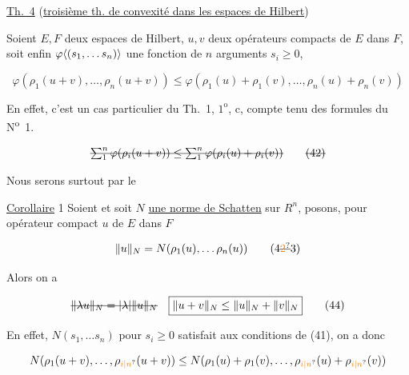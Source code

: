 
\uline{Th.~4} (\uline{troisième th. de convexité dans les espaces de Hilbert})

Soient $E,F$ deux espaces de Hilbert, $u,v$ deux opérateurs compacts de $E$ dans $F$, soit enfin $\varphi\inserted{(s_1,\ldots s_n)}$ une fonction  de $n$ arguments $s_i\geq 0$, 

\[
\varphi(\rho_1(u+v),\ldots,\rho_n(u+v))\leq
\varphi(\rho_1(u)+\rho_1(v),\ldots,\rho_n(u)+\rho_n(v))\tag*{(41)}
\]

En effet, c'est un cas particulier du Th.~1, $1^{\mathrm o}$,  c, compte tenu des formules du N\textsuperscript{o}~1.


\[
\deleted{\sum_{1}^{n}\varphi(\rho_i(u+v))\leq\sum_{1}^{n}\varphi(\rho_i(u)+\rho_i(v))}\tag*{\deleted{(42)}}
\]

Nous serons surtout  par le

\uline{Corollaire} 1 Soient  et soit $N$ \uline{une norme de Schatten} sur $R^n$,  posons, pour  opérateur compact $u$ de $E$ dans $F$

\[
\lVert u\rVert_N=N(\rho_1(u),\ldots\rho_n(u))\tag*{(4\deleted{\unsure{2}}3)}
\]

Alors on a

\[
\deleted{\lVert\lambda u\rVert_N=|\lambda|\lVert u\rVert_N}\quad
\boxed{\lVert u+v\rVert_N\leq\lVert u\rVert_N+\lVert v\rVert_N}\tag*{(44)}
\]


En effet, $N(s_1,\ldots s_n)$ pour $s_i\geq 0$ satisfait aux conditions de (41), on a donc

\[
N(\rho_1(u+v),\ldots,\rho_{\unsure{i|n}}(u+v))\leq
N(\rho_1(u)+\rho_1(v),\ldots,\rho_{\unsure{i|n}}(u)+\rho_{\unsure{i|n}}(v))
\]

